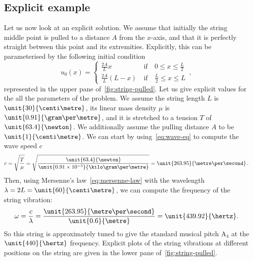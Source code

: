 \subsection{Explicit example}
Let us now look at an explicit solution. We assume that initially the string middle point is pulled to a distance $A$ from the $x$-axis, and that it is perfectly straight between this point and its extremities. Explicitly, this can be parameterised by the following initial condition
\begin{equation}
  u_0(x)=
  \begin{cases}
    \frac{2A}{L}x&~\text{if}\quad 0\leq x \leq \frac{L}{2}\\
    \frac{2A}{L}(L-x)&~\text{if}\quad \frac{L}{2}\leq x \leq L
  \end{cases}\,,
  \label{eq:string-pluck-ic}
\end{equation}
represented in the upper pane of~\cref{fig:string-pulled}. Let us give explicit values for the
all the parameters of the problem. We assume the string length $L$ is $\unit{30}{\centi\metre}$, its linear mass density $\mu$ is $\unit{0.91}{\gram\per\metre}$, and it is stretched to a tension $T$ of $\unit{63.4}{\newton}$. We additionally assume the pulling distance $A$ to be $\unit{1}{\centi\metre}$. We can start by using~\cref{eq:wave-eq} to compute the wave speed $c$
\begin{equation}
  c=\sqrt{\frac{T}{\mu}}=\sqrt{\frac{\unit{63.4}{\newton}}{\unit{0.91\times 10^{-3}}{\kilo\gram\per\metre}}}
  =\unit{263.95}{\metre\per\second}\,.
\end{equation}
Then, using Mersenne's law~\cref{eq:mersenne-law} with the wavelength $\lambda=2L=\unit{60}{\centi\metre}$, we can compute the frequency of the string vibration:
\begin{equation}
  \omega=\frac{c}{\lambda}=\frac{\unit{263.95}{\metre\per\second}}{\unit{0.6}{\metre}}=\unit{439.92}{\hertz}.
\end{equation}
So this string is approximately tuned to give the standard musical pitch $\mathrm{A}_4$ at the $\unit{440}{\hertz}$ frequency. Explicit plots of the string vibrations at different positions on the string are given in the lower pane of~\cref{fig:string-pulled}.
